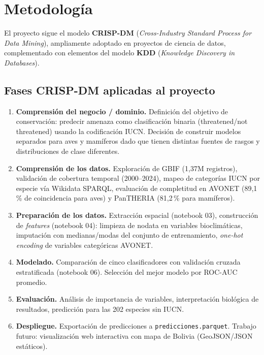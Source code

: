 \documentclass[12pt,a4paper]{article}
\begin{document}
\section{Metodología}

El proyecto sigue el modelo \textbf{CRISP-DM} (\textit{Cross-Industry Standard Process for
Data Mining}), ampliamente adoptado en proyectos de ciencia de datos, complementado con
elementos del modelo \textbf{KDD} (\textit{Knowledge Discovery in Databases}).

\subsection{Fases CRISP-DM aplicadas al proyecto}

\begin{enumerate}[label=\textbf{Fase \arabic*:}]
  \item \textbf{Comprensión del negocio / dominio.}
        Definición del objetivo de conservación: predecir amenaza como clasificación binaria
        (threatened/not threatened) usando la codificación IUCN.
        Decisión de construir modelos separados para aves y mamíferos dado que tienen
        distintas fuentes de rasgos y distribuciones de clase diferentes.

  \item \textbf{Comprensión de los datos.}
        Exploración de GBIF (1,37M registros), validación de cobertura temporal (2000--2024),
        mapeo de categorías IUCN por especie vía Wikidata SPARQL, evaluación de completitud
        en AVONET (89,1\,\% de coincidencia para aves) y PanTHERIA (81,2\,\% para mamíferos).

  \item \textbf{Preparación de los datos.}
        Extracción espacial (notebook 03), construcción de \textit{features} (notebook 04):
        limpieza de nodata en variables bioclimáticas, imputación con medianas/modas del
        conjunto de entrenamiento, \textit{one-hot encoding} de variables categóricas AVONET.

  \item \textbf{Modelado.}
        Comparación de cinco clasificadores con validación cruzada estratificada (notebook 06).
        Selección del mejor modelo por ROC-AUC promedio.

  \item \textbf{Evaluación.}
        Análisis de importancia de variables, interpretación biológica de resultados,
        predicción para las 202 especies sin IUCN.

  \item \textbf{Despliegue.}
        Exportación de predicciones a \texttt{predicciones.parquet}.
        Trabajo futuro: visualización web interactiva con mapa de Bolivia (GeoJSON/JSON estáticos).
\end{enumerate}
\end{document}
